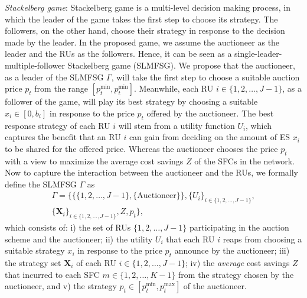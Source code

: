 \documentclass[journal,10pt]{IEEEtran}
\begin{document}
\emph{Stackelberg game}: Stackelberg game is a multi-level decision making process, in which the leader of the game takes the first step to choose its strategy. The followers, on the other hand, choose their strategy in response to the decision made by the leader. In the proposed game, we assume the auctioneer as the leader and the RUs as the followers. Hence, it can be seen as a single-leader-multiple-follower Stackelberg game (SLMFSG). We propose that the auctioneer, as a leader of the SLMFSG $\Gamma$, will take the first step to choose a suitable auction price $p_t$ from the range $[p_t^\text{min},p_t^\text{min}]$. Meanwhile, each RU $i\in\{1, 2, \hdots,J-1\}$, as a follower of the game, will play its best strategy by choosing a suitable $x_i\in\left[0,b_i\right]$ in response to the price $p_t$ offered by the auctioneer. The best response strategy of each RU $i$ will stem from a utility function $U_i$, which captures the benefit that an RU $i$ can gain from deciding on the amount of ES $x_i$ to be shared for the offered price. Whereas the auctioneer chooses the price $p_t$ with a view to maximize the average cost savings $Z$ of the SFCs in the network. Now to capture the interaction between the auctioneer and the RUs, we formally define the SLMFSG $\Gamma$ as
\begin{eqnarray}
\Gamma = \lbrace\{\{1,2,\hdots,J-1\},\{\text{Auctioneer}\}\}, \{U_i\}_{i\in\{1,2,\hdots,J-1\}},\nonumber\\ \{\mathbf{X}_i\}_{i\in\{1,2,\hdots,J-1\}},Z, p_t\rbrace,
\label{eqn:Gamma}
\end{eqnarray}
which consists of: i) the set of RUs $\{1,2,\hdots,J-1\}$ participating in the auction scheme and the auctioneer; ii) the utility $U_i$ that each RU $i$ reaps from choosing a suitable strategy $x_i$ in response to the price $p_t$ announce by the auctioneer; iii) the strategy set $\mathbf{X}_i$ of each RU $i\in\{1,2,\hdots,J-1\}$; iv) the \emph{average} cost savings $Z$ that incurred to each SFC $m\in\{1,2,\hdots,K-1\}$ from the strategy chosen by the auctioneer, and v) the strategy $p_t\in\left[p_t^\text{min}, p_t^\text{max}\right]$ of the auctioneer.
\end{document}
